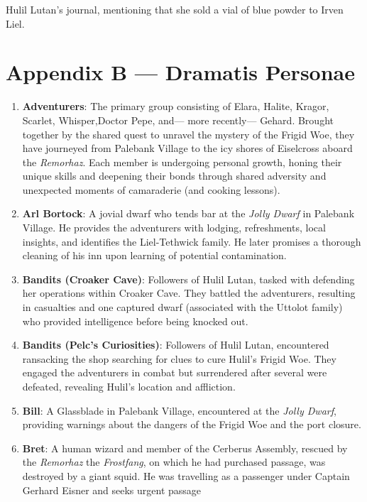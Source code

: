 \documentclass[
  letterpaper,12pt,twoside,twocolumn,openany,
  nodeprecatedcode,bg=full]{dndbook}
\begin{document}
Hulil Lutan's journal, mentioning that she sold a vial of blue powder to
Irven Liel.

\chapter{Appendix B --- Dramatis
Personae}\label{appendix-b-dramatis-personae}

\begin{enumerate}
\def\labelenumi{\arabic{enumi}.}
\item
  \textbf{Adventurers}: The primary group consisting of Elara, Halite,
  Kragor, Scarlet, Whisper,Doctor Pepe, and--- more recently--- Gehard.
  Brought together by the shared quest to unravel the mystery of the
  Frigid Woe, they have journeyed from Palebank Village to the icy
  shores of Eiselcross aboard the \emph{Remorhaz}. Each member is
  undergoing personal growth, honing their unique skills and deepening
  their bonds through shared adversity and unexpected moments of
  camaraderie (and cooking lessons).
\item
  \textbf{Arl Bortock}: A jovial dwarf who tends bar at the \emph{Jolly
  Dwarf} in Palebank Village. He provides the adventurers with lodging,
  refreshments, local insights, and identifies the Liel-Tethwick family.
  He later promises a thorough cleaning of his inn upon learning of
  potential contamination.
\item
  \textbf{Bandits (Croaker Cave)}: Followers of Hulil Lutan, tasked with
  defending her operations within Croaker Cave. They battled the
  adventurers, resulting in casualties and one captured dwarf
  (associated with the Uttolot family) who provided intelligence before
  being knocked out.
\item
  \textbf{Bandits (Pelc's Curiosities)}: Followers of Hulil Lutan,
  encountered ransacking the shop searching for clues to cure Hulil's
  Frigid Woe. They engaged the adventurers in combat but surrendered
  after several were defeated, revealing Hulil's location and
  affliction.
\item
  \textbf{Bill}: A Glassblade in Palebank Village, encountered at the
  \emph{Jolly Dwarf}, providing warnings about the dangers of the Frigid
  Woe and the port closure.
\item
  \textbf{Bret}: A human wizard and member of the Cerberus Assembly,
  rescued by the \emph{Remorhaz} the \emph{Frostfang}, on which he had
  purchased passage, was destroyed by a giant squid. He was travelling
  as a passenger under Captain Gerhard Eisner and seeks urgent passage

\end{enumerate}
\end{document}
